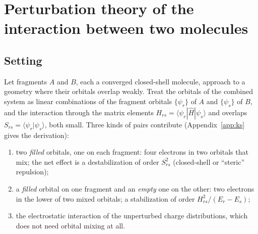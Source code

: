\documentclass[11pt,a4paper]{article}
\newcommand{\set}[1]{\{#1\}}
\begin{document}
\section{Perturbation theory of the interaction between two molecules}
\label{sec:pt}

\subsection{Setting}
Let fragments $A$ and $B$, each a converged closed-shell molecule, approach to a geometry where their orbitals overlap weakly. Treat the orbitals of the combined system as linear combinations of the fragment orbitals $\set{\psi_r}$ of $A$ and $\set{\psi_s}$ of $B$, and the interaction through the matrix elements $H_{rs}=\langle\psi_r|\hat H|\psi_s\rangle$ and overlaps $S_{rs}=\langle\psi_r|\psi_s\rangle$, both small. Three kinds of pairs contribute (Appendix~\ref{app:ks} gives the derivation):
\begin{enumerate}[nosep]
\item two \emph{filled} orbitals, one on each fragment: four electrons in two orbitals that mix; the net effect is a destabilization of order $S_{rs}^2$ (closed-shell or ``steric'' repulsion);
\item a \emph{filled} orbital on one fragment and an \emph{empty} one on the other: two electrons in the lower of two mixed orbitals; a stabilization of order $H_{rs}^2/(E_r-E_s)$;
\item the electrostatic interaction of the unperturbed charge distributions, which does not need orbital mixing at all.
\end{enumerate}
\end{document}
